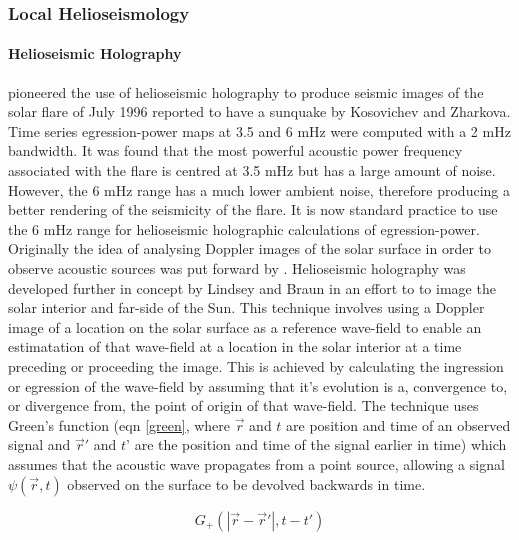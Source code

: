 \subsubsection{Local Helioseismology}

\paragraph{Helioseismic Holography}\label{helioholog}
\cite{1999ApJ...513L.143D} pioneered the use of helioseismic holography to produce seismic images of the solar flare of July 1996 reported to have a sunquake by Kosovichev and Zharkova. Time series egression-power maps at 3.5 and 6 mHz were computed with a 2 mHz bandwidth. It was found that the most powerful acoustic power frequency associated with the flare is centred at 3.5 mHz but has a large amount of noise. However, the 6 mHz range has a much lower ambient noise, therefore producing a better rendering of the seismicity of the flare. It is now standard practice to use the 6 mHz range for helioseismic holographic calculations of egression-power. \\
Originally the idea of analysing Doppler images of the solar surface in order to observe acoustic sources was put forward by \cite{1975CRASB.281...93R}. Helioseismic holography was developed further in concept by Lindsey and Braun \citep{1990SoPh..126..101L, 1992ApJ...392..739B, 1997ApJ...485..895L} in an effort to to image the solar interior and far-side of the Sun. This technique involves using a Doppler image of a location on the solar surface as a reference wave-field to enable an estimatation of that wave-field at a location in the solar interior at a time preceding or proceeding the image. This is achieved by calculating the ingression or egression of the wave-field by assuming that it's evolution is a, convergence to, or divergence from, the point of origin of that wave-field. The technique uses Green's function (eqn \ref{green}, where $\vec{r}$ and $t$ are position and time of an observed signal and $\vec{r}'$ and $t$' are the position and time of the signal earlier in time) which assumes that the acoustic wave propagates from a point source, allowing a signal $\psi(\vec{r},t)$ observed on the surface to be devolved backwards in time. 

\begin{equation}\label{green}
G_{+}(|\vec{r}-\vec{r}'|,t-t')
\end{equation}

